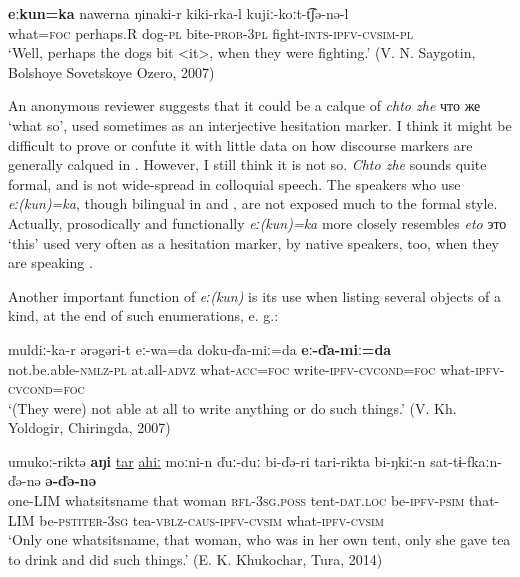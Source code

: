 \documentclass[output=paper,colorlinks,citecolor=brown]{langscibook}
\begin{document}
\ea
    \label{example6.46}
    \gll \textbf{eːkun=ka}	nawerna	ŋinaki-r	kiki-rka-l	kujiː-koːt-t͡ʃə-nə-l\\
    what=\textsc{foc}	perhaps.R	dog-\textsc{pl}	bite-\textsc{prob}-3\textsc{pl}	fight-\textsc{ints}-\textsc{ipfv}-\textsc{cvsim}-\textsc{pl}\\
    \glt `Well, perhaps the dogs bit <it>, when they were fighting.' (V. N. Saygotin, Bolshoye Sovetskoye Ozero, 2007)\\
    \z

An anonymous reviewer suggests that it could be a calque of  \textit{chto zhe} что же ‘what so’, used sometimes as an interjective hesitation marker. I think it might be difficult to prove or confute it with little data on how discourse markers are generally calqued in . However, I still think it is not so. \textit{Chto zhe} sounds quite formal, and is not wide-spread in  colloquial speech. The speakers who use \textit{eː(kun)=ka}, though bilingual in  and , are not exposed much to the formal  style. Actually, prosodically and functionally \textit{eː(kun)=ka} more closely resembles  \textit{eto} это ‘this’ used very often as a hesitation marker, by native  speakers, too, when they are speaking .

Another important function of \textit{eː(kun)} is its use when listing several objects of a kind, at the end of such enumerations, e. g.:

\ea
    \label{example6.47}
    \gll muldiː-ka-r	ərəgəri-t	eː-wa=da    doku-ďa-miː=da	\textbf{eː-ďa-miː=da}\\
    not.be.able-\textsc{nmlz}-\textsc{pl}	at.all-\textsc{advz}	what-\textsc{acc}=\textsc{foc}    write-\textsc{ipfv}-\textsc{cvcond}=\textsc{foc}	what-\textsc{ipfv}-\textsc{cvcond}=\textsc{foc}\\
    \glt `(They were) not able at all to write anything or do such things.' (V. Kh. Yoldogir, Chiringda, 2007)\\
    \z

\ea
    \label{example6.48}
    \gll umukoː-riktə	\textbf{aŋi}	\uline{tar}	\uline{ahiː}	moːni-n ďuː-duː	bi-ďə-ri	tari-rikta	bi-ŋkiː-n	sat-tɨ-fkaːn-ďə-nə  \textbf{ə-ďə-nə}\\
    one-LIM	whatsitsname	that	woman	\textsc{rfl}-\textsc{3sg.poss}   tent-\textsc{dat.loc}	be-\textsc{ipfv}-\textsc{psim}	that-LIM	be-\textsc{pstiter}-3\textsc{sg}  tea-\textsc{vblz}-\textsc{caus}-\textsc{ipfv}-\textsc{cvsim}    what-\textsc{ipfv}-\textsc{cvsim}	\\
    \glt `Only one whatsitsname, that woman, who was in her own tent, only she gave tea to drink and did such things.' (E. K. Khukochar, Tura, 2014)\\
    \z
\end{document}
